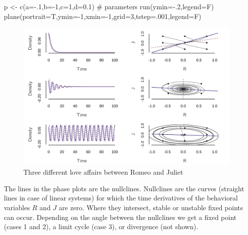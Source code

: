\documentclass[
  a4paper,
  DIV=11,
  numbers=noendperiod]{scrreprt}
\newenvironment{Shaded}{\begin{snugshade}}{\end{snugshade}}
\newcommand{\AttributeTok}[1]{\textcolor[rgb]{0.40,0.45,0.13}{#1}}
\newcommand{\CommentTok}[1]{\textcolor[rgb]{0.37,0.37,0.37}{#1}}
\newcommand{\DecValTok}[1]{\textcolor[rgb]{0.68,0.00,0.00}{#1}}
\newcommand{\FloatTok}[1]{\textcolor[rgb]{0.68,0.00,0.00}{#1}}
\newcommand{\FunctionTok}[1]{\textcolor[rgb]{0.28,0.35,0.67}{#1}}
\newcommand{\NormalTok}[1]{\textcolor[rgb]{0.00,0.23,0.31}{#1}}
\newcommand{\OtherTok}[1]{\textcolor[rgb]{0.00,0.23,0.31}{#1}}
\newcommand{\SpecialCharTok}[1]{\textcolor[rgb]{0.37,0.37,0.37}{#1}}
\begin{document}
\begin{Shaded}
\begin{Highlighting}[]
\NormalTok{p }\OtherTok{\textless{}{-}} \FunctionTok{c}\NormalTok{(}\AttributeTok{a=}\SpecialCharTok{{-}}\NormalTok{.}\DecValTok{1}\NormalTok{,}\AttributeTok{b=}\SpecialCharTok{{-}}\DecValTok{1}\NormalTok{,}\AttributeTok{c=}\DecValTok{1}\NormalTok{,}\AttributeTok{d=}\FloatTok{0.1}\NormalTok{) }\CommentTok{\# parameters}
\FunctionTok{run}\NormalTok{(}\AttributeTok{ymin=}\SpecialCharTok{{-}}\NormalTok{.}\DecValTok{2}\NormalTok{,}\AttributeTok{legend=}\NormalTok{F)}
\FunctionTok{plane}\NormalTok{(}\AttributeTok{portrait=}\NormalTok{T,}\AttributeTok{ymin=}\SpecialCharTok{{-}}\DecValTok{1}\NormalTok{,}\AttributeTok{xmin=}\SpecialCharTok{{-}}\DecValTok{1}\NormalTok{,}\AttributeTok{grid=}\DecValTok{3}\NormalTok{,}\AttributeTok{tstep=}\NormalTok{.}\DecValTok{001}\NormalTok{,}\AttributeTok{legend=}\NormalTok{F)}
\end{Highlighting}
\end{Shaded}

\begin{figure}

{\centering \includegraphics{media/ch4n/fig-ch4n-img9-old-57.png}

}

\caption{\label{fig-ch4n-img9-old-57}Three different love affairs
between Romeo and Juliet}

\end{figure}

The lines in the phase plots are the nullclines. Nullclines are the
curves (straight lines in case of linear systems) for which the time
derivatives of the behavioral variables \(R\) and \(J\) are zero. Where
they intersect, stable or unstable fixed points can occur. Depending on
the angle between the nullclines we get a fixed point (cases 1 and 2), a
limit cycle (case 3), or divergence (not shown).
\end{document}
